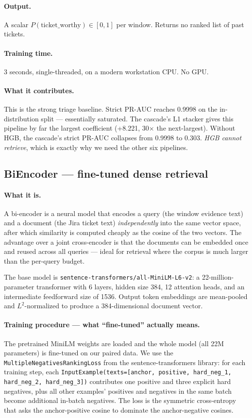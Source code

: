 \paragraph{Output.} A scalar $P(\text{ticket\_worthy}) \in [0, 1]$ per window. Returns no ranked list of past tickets.

\paragraph{Training time.} 3 seconds, single-threaded, on a modern workstation CPU. No GPU.

\paragraph{What it contributes.} This is the strong triage baseline. Strict PR-AUC reaches 0.9998 on the in-distribution split --- essentially saturated. The cascade's L1 stacker gives this pipeline by far the largest coefficient (+8.221, 30$\times$ the next-largest). Without HGB, the cascade's strict PR-AUC collapses from 0.9998 to 0.303. \emph{HGB cannot retrieve}, which is exactly why we need the other six pipelines.

\subsection{BiEncoder --- fine-tuned dense retrieval}

\paragraph{What it is.} A bi-encoder is a neural model that encodes a query (the window evidence text) and a document (the Jira ticket text) \emph{independently} into the same vector space, after which similarity is computed cheaply as the cosine of the two vectors. The advantage over a joint cross-encoder is that the documents can be embedded once and reused across all queries --- ideal for retrieval where the corpus is much larger than the per-query budget.

The base model is \texttt{sentence-transformers/all-MiniLM-L6-v2}: a 22-million-parameter transformer with 6 layers, hidden size 384, 12 attention heads, and an intermediate feedforward size of 1536. Output token embeddings are mean-pooled and $L^2$-normalized to produce a 384-dimensional document vector.

\paragraph{Training procedure --- what ``fine-tuned'' actually means.} The pretrained MiniLM weights are loaded and the whole model (all 22M parameters) is fine-tuned on our paired data. We use the \texttt{MultipleNegativesRankingLoss} from the sentence-transformers library: for each training step, each \texttt{InputExample(texts=[anchor, positive, hard\_neg\_1, hard\_neg\_2, hard\_neg\_3])} contributes one positive and three explicit hard negatives, plus all other examples' positives and negatives in the same batch become additional in-batch negatives. The loss is the symmetric cross-entropy that asks the anchor-positive cosine to dominate the anchor-negative cosines.

